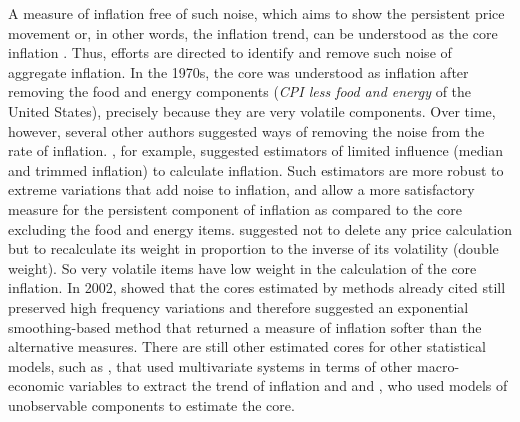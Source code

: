 \documentclass[10pt]{article}
\begin{document}
A measure of inflation free of such noise, which aims to show the persistent price movement or, in other words, the inflation trend, can be understood as the core inflation \citep{bryan1994}. Thus, efforts are directed to identify and remove such noise of aggregate inflation. In the 1970s, the core was understood as inflation after removing the food and energy components (\textit{CPI less food and energy} of the United States), precisely because they are very volatile components. Over time, however, several other authors suggested ways of removing the noise from the rate of inflation. \cite{bryan1994}, for example, suggested estimators of limited influence (median and trimmed inflation) to calculate inflation. Such estimators are more robust to extreme variations that add noise to inflation, and allow a more satisfactory measure for the persistent component of inflation as compared to the core excluding the food and energy items. \cite{dow1994} suggested not to delete any price calculation but to recalculate its weight in proportion to the inverse of its volatility (double weight). So very volatile items have low weight in the calculation of the core inflation. In 2002,  \citeauthor{cogley2002} showed that the cores estimated by methods already cited still preserved high frequency variations and therefore suggested an exponential smoothing-based method that returned a measure of inflation softer than the alternative measures. There are still other estimated cores for other statistical models, such as \cite{quah}, that used multivariate systems in terms of other macro-economic variables to extract the trend of inflation and \cite{sinclair} and \cite{stock}, who used models of unobservable components to estimate the core.
\end{document}
